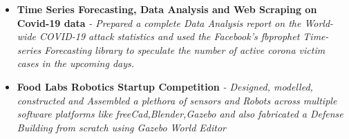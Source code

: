 \documentclass{article}
\begin{document}
\begin{itemize}
{              \href{https://github.com/teetangh/Kaustav-AI-workspace/tree/main/ML}{\text{[AI-workspace]}}.
          }{}
    \item{\textbf{\large{Time Series Forecasting, Data Analysis and Web Scraping on Covid-19 data}}}
          \newline
          \textit{- Prepared a complete Data Analysis report on the World-wide COVID-19 attack statistics and used the Facebook's fbprophet Time-series Forecasting library to speculate the number of active corona victim cases in the upcoming days.}
    \item{\textbf{\large{Food Labs Robotics Startup Competition}}}
          \newline
          \textit{- Designed, modelled, constructed and
              Assembled a plethora of sensors and Robots across multiple software platforms like
              freeCad,Blender,Gazebo and also fabricated a Defense Building from scratch using Gazebo World Editor}
\end{itemize}


\end{document}
